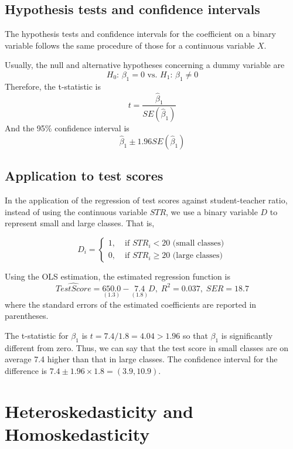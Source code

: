\documentclass[a4paper,11pt]{article}
\begin{document}
\subsection{Hypothesis tests and confidence intervals}
\label{sec:org6d2386e}

The hypothesis tests and confidence intervals for the coefficient on a
binary variable follows the same procedure of those for a continuous
variable \(X\).

Usually, the null and alternative hypotheses concerning a dummy variable are
\[ H_0:\, \beta_1 = 0 \text{ vs. } H_1:\, \beta_1 \neq 0 \]
Therefore, the t-statistic is
\[ t = \frac{\hat{\beta}_1}{SE(\hat{\beta}_1)} \]
And the 95\% confidence interval is
\[ \hat{\beta}_1 \pm 1.96 SE(\hat{\beta}_1) \]


\subsection{Application to test scores}
\label{sec:orgf27fa70}

In the application of the regression of test scores against
student-teacher ratio, instead of using the continuous variable \(STR\),
we use a binary variable \(D\) to represent small and large
classes. That is,

\begin{equation*}
D_i =
\begin{cases}
1,\; &\text{if } STR_i < 20 \text{ (small classes)} \\
0,\; &\text{if } STR_i \geq 20 \text{ (large classes)}
\end{cases}
\end{equation*}

Using the OLS estimation, the estimated regression function is
\begin{equation*}
\widehat{TestScore} = \underset{\displaystyle (1.3)}{650.0} -
\underset{\displaystyle (1.8)}{7.4} D,\; R^2 = 0.037,\; SER = 18.7
\end{equation*}
where the standard errors of the estimated coefficients are reported
in parentheses.

The t-statistic for \(\beta_1\) is \(t = 7.4 / 1.8 = 4.04 > 1.96\) so that
\(\beta_1\) is significantly different from zero. Thus, we can say that
the test score in small classes are on average 7.4 higher than that in
large classes. The confidence interval for the difference is \(7.4 \pm
1.96 \times 1.8 = (3.9, 10.9)\).


\section{Heteroskedasticity and Homoskedasticity}
\label{sec:org256038c}
\end{document}
